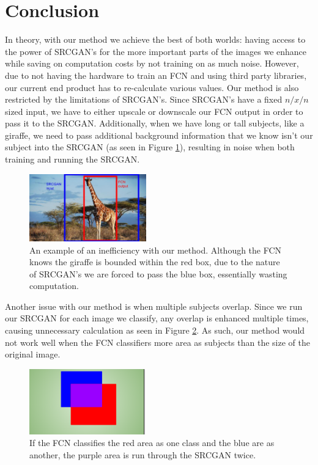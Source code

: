 \section{Conclusion}

In theory, with our method we achieve the best of both worlds: having access to the power of SRCGAN’s for the more important parts of the images we enhance while saving on computation costs by not training on as much noise. However, due to not having the hardware to train an FCN and using third party libraries, our current end product has to re-calculate various values.
Our method is also restricted by the limitations of SRCGAN’s. Since SRCGAN’s
have a fixed $n/x/n$ sized input, we have to either upscale or downscale our FCN
output in order to pass it to the SRCGAN. Additionally, when we have long or
tall subjects, like a giraffe, we need to pass additional background information
that we know isn’t our subject into the SRCGAN (as seen in Figure \ref{fig:giraffe}), resulting in
noise when both training and running the SRCGAN.

\begin{figure}
    \centering
    \includegraphics[width=0.45\textwidth]{images/giraffe.png}
    \caption{An example of an inefficiency with our method. Although the FCN knows the giraffe is bounded within the red box, due to the nature of SRCGAN's we are forced to pass the blue box, essentially wasting computation.}
    \label{fig:giraffe}
\end{figure}


Another issue with our method is when multiple subjects overlap. Since we run our SRCGAN for each image we classify, any overlap is enhanced multiple times, causing unnecessary calculation as seen in Figure \ref{fig:crossover}. As such, our method would not work well when the FCN classifiers more area as subjects than the size of the original image.

\begin{figure}
    \centering
    \includegraphics[width=0.45\textwidth]{images/crossover.png}
    \caption{If the FCN classifies the red area as one class and the blue are as another, the purple area is run through the SRCGAN twice.}
    \label{fig:crossover}
\end{figure}


